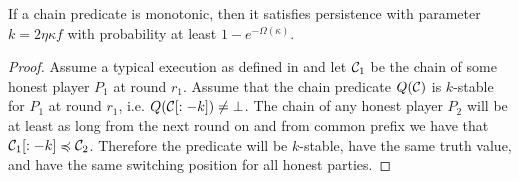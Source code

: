 \begin{theorem}
    If a chain predicate is monotonic, then it satisfies persistence with
    parameter $k = 2\eta \kappa f$ with probability at least $1 -
    e^{-\Omega(\kappa)}$.
\end{theorem}

\begin{proof}
    Assume a typical execution as defined in \cite{backbone} and let $\mathcal{C}_1$
    be the chain of some honest player $P_1$ at round $r_1$. Assume that the
    chain predicate $Q(\mathcal{C})$ is $k$-stable for $P_1$ at round $r_1$, i.e.
    $Q(\mathcal{C}[:-k]) \neq \bot$.  The chain of any honest player $P_2$ will be
    at least as long from the next round on and from common prefix we have that
    $\mathcal{C}_1[:-k] \preccurlyeq \mathcal{C}_2$. Therefore the predicate will be
    $k$-stable, have the same truth value, and have the same switching position
    for all honest parties.
\end{proof}

